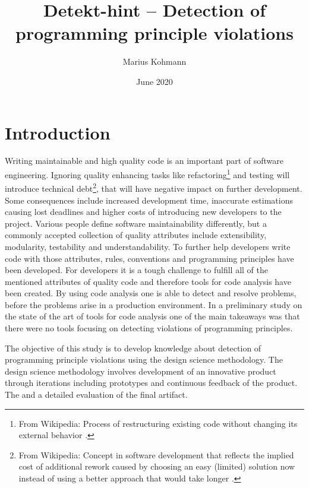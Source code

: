 \documentclass{article}
\title{Detekt-hint -- Detection of programming principle violations}
\author{Marius Kohmann}
\date{June 2020}
\begin{document}
\maketitle

\begin{abstract}
	
	
	
\end{abstract}


\clearpage
\tableofcontents
\clearpage
\section{Introduction}
Writing maintainable and high quality code is an important part of software engineering. Ignoring quality enhancing tasks like refactoring\footnote{From Wikipedia: Process of restructuring existing code without changing its external behavior \cite{refactoring}.} and testing will introduce technical debt\footnote{From Wikipedia: Concept in software development that reflects the implied cost of additional rework caused by choosing an easy (limited) solution now instead of using a better approach that would take longer \cite{technicalDebt}.}, that will have negative impact on further development. Some consequences include increased development time, inaccurate estimations causing lost deadlines and higher costs of introducing new developers to the project.
Various people define software maintainability differently, but a commonly
accepted collection of quality attributes include extensibility, modularity, testability and understandability. To further help developers write code with those attributes, rules, conventions and programming principles have been developed. For developers it is a tough challenge to fulfill all of the mentioned attributes of quality code and therefore tools for code analysis have been created. By using code analysis one is able to detect and resolve problems, before the problems arise in a production environment. In a preliminary study on the state of the art of tools for code analysis one of the main takeaways was that there were no tools focusing on detecting violations of programming principles. 

The objective of this study is to develop knowledge about detection of programming principle violations using the design science methodology. The design science methodology involves development of an innovative product through iterations including prototypes and continuous feedback of the product. The and a detailed evaluation of the final artifact.
\end{document}
